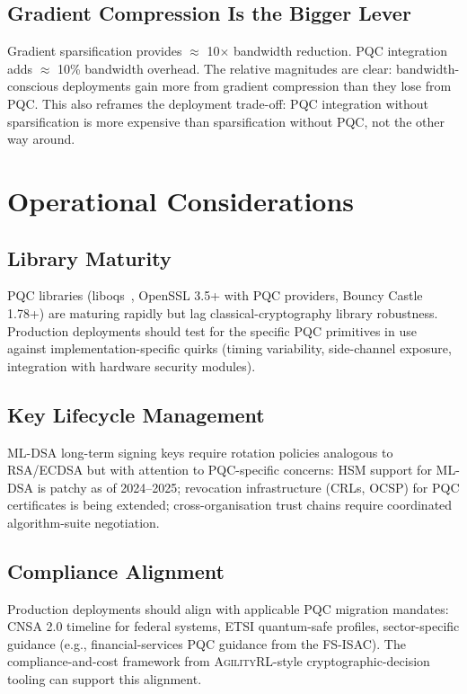 \documentclass[sigconf,nonacm]{acmart}
\begin{document}
\subsection{Gradient Compression Is the Bigger Lever}

Gradient sparsification provides $\approx$ 10$\times$ bandwidth
reduction. PQC integration adds $\approx$ 10\% bandwidth overhead.
The relative magnitudes are clear: bandwidth-conscious deployments
gain more from gradient compression than they lose from PQC. This
also reframes the deployment trade-off: PQC integration without
sparsification is more expensive than sparsification without PQC,
not the other way around.

\section{Operational Considerations}

\subsection{Library Maturity}

PQC libraries (liboqs~\cite{liboqs2024}, OpenSSL 3.5+ with
PQC providers, Bouncy Castle 1.78+) are maturing rapidly but lag
classical-cryptography library robustness. Production deployments
should test for the specific PQC primitives in use against
implementation-specific quirks (timing variability, side-channel
exposure, integration with hardware security modules).

\subsection{Key Lifecycle Management}

ML-DSA long-term signing keys require rotation policies analogous
to RSA/ECDSA but with attention to PQC-specific concerns: HSM
support for ML-DSA is patchy as of 2024--2025; revocation
infrastructure (CRLs, OCSP) for PQC certificates is being
extended; cross-organisation trust chains require coordinated
algorithm-suite negotiation.

\subsection{Compliance Alignment}

Production deployments should align with applicable PQC migration
mandates: CNSA 2.0 timeline for federal systems, ETSI quantum-safe
profiles, sector-specific guidance (e.g., financial-services PQC
guidance from the FS-ISAC). The compliance-and-cost framework from
\textsc{AgilityRL}-style cryptographic-decision tooling can
support this alignment.
\end{document}
